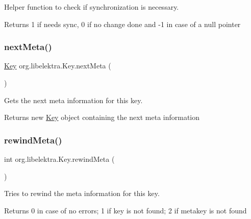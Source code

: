 Helper function to check if synchronization is necessary. 

\begin{DoxyReturn}{Returns}
1 if needs sync, 0 if no change done and -\/1 in case of a null pointer 
\end{DoxyReturn}
\mbox{\label{classorg_1_1libelektra_1_1Key_ace2853c3ca003e9099272871a6d61ad6}} 
\subsubsection{\texorpdfstring{next\+Meta()}{nextMeta()}}
{\footnotesize\ttfamily \hyperlink{classorg_1_1libelektra_1_1Key}{Key} org.\+libelektra.\+Key.\+next\+Meta (\begin{DoxyParamCaption}{ }\end{DoxyParamCaption})\hspace{0.3cm}{\ttfamily [inline]}}



Gets the next meta information for this key. 

\begin{DoxyReturn}{Returns}
new \hyperlink{classorg_1_1libelektra_1_1Key}{Key} object containing the next meta information 
\end{DoxyReturn}
\mbox{\label{classorg_1_1libelektra_1_1Key_aea5c4a3a24237dca57e55beca85db0be}} 
\subsubsection{\texorpdfstring{rewind\+Meta()}{rewindMeta()}}
{\footnotesize\ttfamily int org.\+libelektra.\+Key.\+rewind\+Meta (\begin{DoxyParamCaption}{ }\end{DoxyParamCaption})\hspace{0.3cm}{\ttfamily [inline]}}



Tries to rewind the meta information for this key. 

\begin{DoxyReturn}{Returns}
0 in case of no errors; 1 if key is not found; 2 if metakey is not found 
\end{DoxyReturn}
\mbox{\label{classorg_1_1libelektra_1_1Key_a5226472bedc6a02dee826ee3facdb25f}} 
